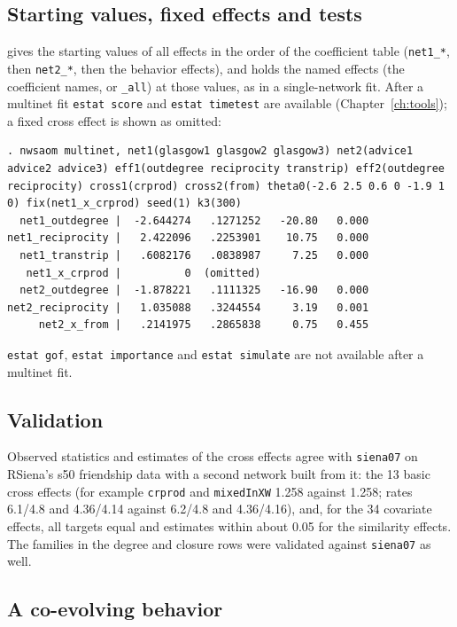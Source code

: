 \subsection{Starting values, fixed effects and tests}
 gives the starting values of all effects in the order of the coefficient table (\texttt{net1\_*}, then \texttt{net2\_*}, then the behavior effects), and  holds the named effects (the coefficient names, or \texttt{\_all}) at those values, as in a single-network fit. After a multinet fit \texttt{estat score} and \texttt{estat timetest} are available (Chapter~\ref{ch:tools}); a fixed cross effect is shown as omitted:
\begin{lstlisting}
. nwsaom multinet, net1(glasgow1 glasgow2 glasgow3) net2(advice1 advice2 advice3) eff1(outdegree reciprocity transtrip) eff2(outdegree reciprocity) cross1(crprod) cross2(from) theta0(-2.6 2.5 0.6 0 -1.9 1 0) fix(net1_x_crprod) seed(1) k3(300)
  net1_outdegree |  -2.644274   .1271252   -20.80   0.000
net1_reciprocity |   2.422096   .2253901    10.75   0.000
  net1_transtrip |   .6082176   .0838987     7.25   0.000
   net1_x_crprod |          0  (omitted)
  net2_outdegree |  -1.878221   .1111325   -16.90   0.000
net2_reciprocity |   1.035088   .3244554     3.19   0.001
     net2_x_from |   .2141975   .2865838     0.75   0.455
\end{lstlisting}
\texttt{estat gof}, \texttt{estat importance} and \texttt{estat simulate} are not available after a multinet fit.

\subsection{Validation}

Observed statistics and estimates of the cross effects agree with \texttt{siena07} on RSiena's s50 friendship data with a second network built from it: the 13 basic cross effects (for example \texttt{crprod} and \texttt{mixedInXW} 1.258 against 1.258; rates 6.1/4.8 and 4.36/4.14 against 6.2/4.8 and 4.36/4.16), and, for the 34 covariate effects, all targets equal and estimates within about 0.05 for the similarity effects. The families in the degree and closure rows were validated against \texttt{siena07} as well.

\subsection{A co-evolving behavior}\label{sec:mn-behavior}


